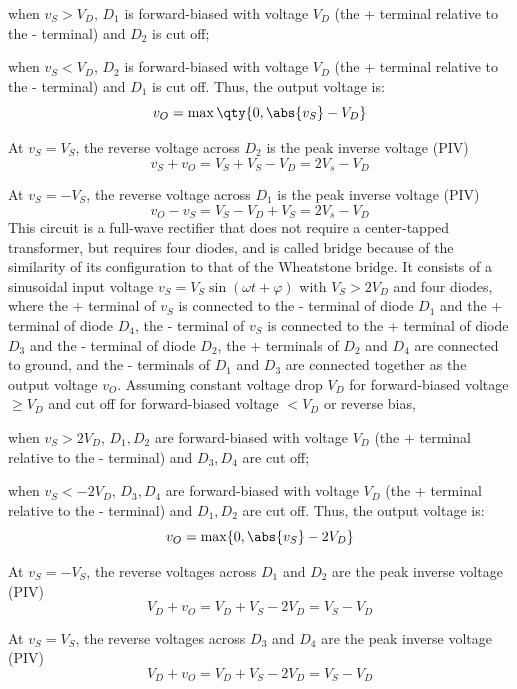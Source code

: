\documentclass[a4paper,12pt]{report}
\begin{document}
\bit
\item when $v_S>V_D$, $D_1$ is forward-biased with voltage $V_D$ (the + terminal relative to the - terminal) and $D_2$ is cut off;
\item when $v_S<V_D$, $D_2$ is forward-biased with voltage $V_D$ (the + terminal relative to the - terminal) and $D_1$ is cut off.
\eit
Thus, the output voltage is:
\[v_O=\max\qty{0,\abs{v_S}-V_D}\]
\bit
\item At $v_S=V_S$, the reverse voltage across $D_2$ is the peak inverse voltage (PIV)
\[v_S+v_O=V_S+V_S-V_D=2V_s-V_D\]
\item At $v_S=-V_S$, the reverse voltage across $D_1$ is the peak inverse voltage (PIV)
\[v_O-v_S=V_S-V_D+V_S=2V_s-V_D\]
\eit
{}
This circuit is a full-wave rectifier that does not require a center-tapped transformer, but requires four diodes, and is called bridge because of the similarity of its configuration to that of the Wheatstone bridge. It consists of a sinusoidal input voltage $v_S=V_S\sin(\omega t+\varphi)$ with $V_S>2V_D$ and four diodes, where the + terminal of $v_S$ is connected to the - terminal of diode $D_1$ and the + terminal of diode $D_4$, the - terminal of $v_S$ is connected to the + terminal of diode $D_3$ and the - terminal of diode $D_2$, the + terminals of $D_2$ and $D_4$ are connected to ground, and the - terminals of $D_1$ and $D_3$ are connected together as the output voltage $v_O$. Assuming constant voltage drop $V_D$ for forward-biased voltage $\ge V_D$ and cut off for forward-biased voltage $<V_D$ or reverse bias,
\bit
\item when $v_S>2V_D$, $D_1,D_2$ are forward-biased with voltage $V_D$ (the + terminal relative to the - terminal) and $D_3,D_4$ are cut off;
\item when $v_S<-2V_D$, $D_3,D_4$ are forward-biased with voltage $V_D$ (the + terminal relative to the - terminal) and $D_1,D_2$ are cut off.
\eit
Thus, the output voltage is:
\[v_O=\max\{0,\abs{v_S}-2V_D\}\]
\bit
\item At $v_S=-V_S$, the reverse voltages across $D_1$ and $D_2$ are the peak inverse voltage (PIV)
\[V_D+v_O=V_D+V_S-2V_D=V_S-V_D\]
\item At $v_S=V_S$, the reverse voltages across $D_3$ and $D_4$ are the peak inverse voltage (PIV)
\[V_D+v_O=V_D+V_S-2V_D=V_S-V_D\]
\eit
{}
\end{document}
